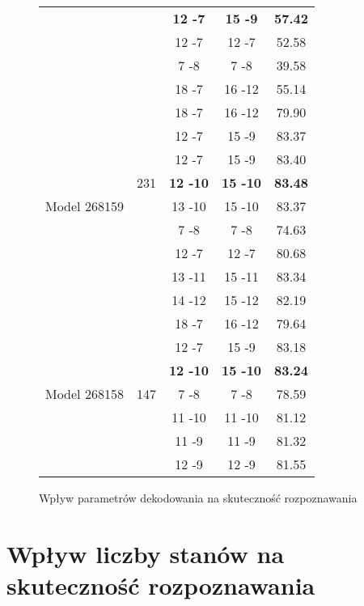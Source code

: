 \documentclass[shortabstract, mgr]{iithesis}
\begin{document}
\begin{figure}
\begin{tabular}{|c|c|c|c|c|}
					&& \textbf{12 -7} & \textbf{15 -9} & \textbf{57.42} \\
					&& 12 -7 & 12 -7 & 52.58 \\
					&& 7 -8  & 7 -8  & 39.58 \\
					&& 18 -7 & 16 -12& 55.14 \\
					\hline
					\multirow{9}{*}{Model 268159} &
					\multirow{7}{*}{231}            &
					18 -7 & 16 -12 & 79.90 \\
					&& 12 -7 & 15 -9  & 83.37 \\
					&& 12 -7 & 15 -9  & 83.40 \\
					&& \textbf{12 -10}& \textbf{15 -10} & \textbf{83.48} \\
					&& 13 -10& 15 -10 & 83.37 \\
					&& 7 -8  & 7 -8   & 74.63 \\
					&& 12 -7 & 12 -7  & 80.68 \\
					&& 13 -11& 15 -11 & 83.34 \\
					&& 14 -12& 15 -12 & 82.19 \\
					\hline
					\multirow{7}{*}{Model 268158} &
					\multirow{7}{*}{147}            &
					18 -7 & 16 -12 & 79.64 \\
					&& 12 -7 & 15 -9  & 83.18 \\
					&& \textbf{12 -10}& \textbf{15 -10} & \textbf{83.24} \\
					&& 7 -8  & 7 -8   & 78.59 \\
					&& 11 -10& 11 -10 &  81.12 \\
					&& 11 -9 & 11 -9  &  81.32 \\
					&& 12 -9 & 12 -9  &  81.55 \\
					\hline					
					
				\end{tabular}
			\label{tab:metadata_impact}
			\caption{Wpływ parametrów dekodowania na skuteczność rozpoznawania }
		\end{figure}
		
	\section{Wpływ liczby stanów na skuteczność rozpoznawania }
		\label{sec:q-num_impact}
	
\end{document}
